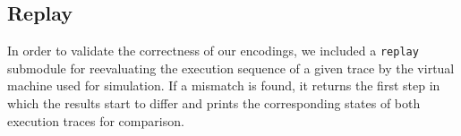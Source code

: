 
%
%
%
%
%

\subsection{Replay}

In order to validate the correctness of our encodings, we included a \texttt{replay} submodule for reevaluating the execution sequence of a given trace by the virtual machine used for simulation.
If a mismatch is found, it returns the first step in which the results start to differ and prints the corresponding states of both execution traces for comparison.
